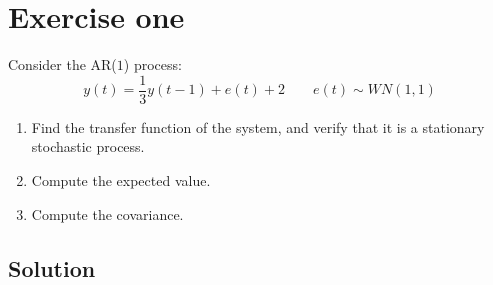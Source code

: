 \section{Exercise one}

Consider the AR($1$) process: 
\[y(t)=\dfrac{1}{3}y(t-1)+e(t)+2 \qquad e(t)\sim WN(1,1)\]
\begin{enumerate}
    \item Find the transfer function of the system, and verify that it is a stationary stochastic process. 
    \item Compute the expected value. 
    \item Compute the covariance. 
\end{enumerate}

\subsection{Solution}

